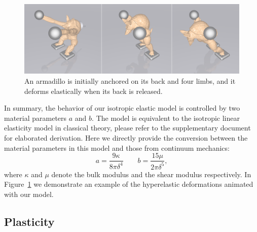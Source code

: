 \begin{figure}[t]
  \centering
  \includegraphics[width=\linewidth]{../figs/demo_pull_armadillo.png}
  \caption{\label{fig:3}
  An armadillo is initially anchored on its back and four limbs, and it deforms elastically when its back is released.
}
\end{figure}
In summary, the behavior of our isotropic elastic model is controlled by two material parameters $a$ and $b$. The model is equivalent to the isotropic linear elasticity model in classical theory, please refer to the supplementary document for elaborated derivation. Here we directly provide the conversion between the material parameters in this model and those from continuum mechanics:
\begin{equation}
a = \frac{9\kappa}{8\pi\delta^4} \qquad b = \frac{15\mu}{2\pi\delta^5},
\label{eq:9}
\end{equation}
where $\kappa$ and $\mu$ denote the bulk modulus and the shear modulus respectively. In Figure~\ref{fig:3} we demonstrate an example of the hyperelastic deformations animated with our model.

\subsection{Plasticity}

